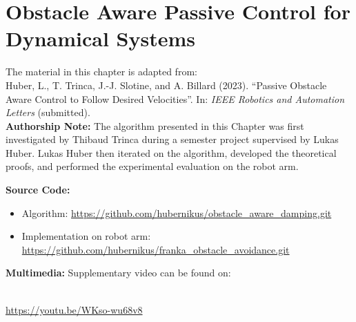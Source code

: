\chapter{Obstacle Aware Passive Control for Dynamical Systems} \label{chap:passivity_aware_damping}
% 
% 
\begin{publicationbox}
	The material in this chapter is adapted from: \\
	Huber, L., T. Trinca, J.-J. Slotine, and A. Billard (2023). “Passive Obstacle Aware Control to Follow Desired Velocities”. In: \textit{IEEE Robotics and Automation Letters} (submitted). \\

\textbf{Authorship Note:}
 The algorithm presented in this Chapter was first investigated by Thibaud Trinca during a semester project supervised by Lukas Huber.
 Lukas Huber then iterated on the algorithm, developed the theoretical proofs, and performed the experimental evaluation on the robot arm.

\textbf{Source Code:}
\begin{itemize}
	\setlength\itemsep{-0.0em}
\item Algorithm:
	\url{https://github.com/hubernikus/obstacle_aware_damping.git}
\item Implementation on robot arm: \\
	\url{https://github.com/hubernikus/franka_obstacle_avoidance.git} 
\end{itemize}

\textbf{Multimedia:}
Supplementary video can be found on:
\vspace{1em}


\vspace{1.0em} \centering
  \\
 \url{https://youtu.be/WKso-wu68v8}

\end{publicationbox}

